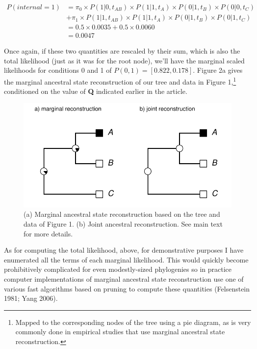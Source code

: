 \documentclass{article}
\begin{document}
\[\begin{aligned}
P(internal=1) & = \pi_{0} \times P(1|0,t_{AB}) \times P(1|1,t_{A}) \times P(0|1,t_{B}) \times P(0|0,t_{C})\\
            & + \pi_{1} \times P(1|1,t_{AB}) \times P(1|1,t_{A}) \times P(0|1,t_{B}) \times P(0|1,t_{C})\\
            & =  0.5 \times 0.0035 + 0.5 \times 0.0060 \\
            & = 0.0047
\end{aligned}\]

Once again, if these two quantities are rescaled by their sum, which is also the total likelihood (just as it was for the root node), we'll have the marginal scaled likelihoods for conditions 0 and 1 of \(P(0,1) = [0.822, 0.178]\). Figure 2a gives the marginal ancestral state reconstruction of our tree and data in Figure 1,\footnote{Mapped to the corresponding nodes of the tree using a pie diagram, as is very commonly done in empirical studies that use marginal ancestral state reconstruction.} conditioned on the value of \textbf{Q} indicated earlier in the article.

\begin{figure}
\centering
\includegraphics{Revell.AncestralReconstruction_files/figure-latex/fig2-1.pdf}
\caption{\label{fig:fig2}(a) Marginal ancestral state reconstruction based on the tree and data of Figure 1. (b) Joint ancestral reconstruction. See main text for more details.}
\end{figure}

As for computing the total likelihood, above, for demonstrative purposes I have enumerated all the terms of each marginal likelihood. This would quickly become prohibitively complicated for even modestly-sized phylogenies so in practice computer implementations of marginal ancestral state reconstruction use one of various fast algorithms based on pruning to compute these quantities (Felsenstein 1981; Yang 2006).
\end{document}
